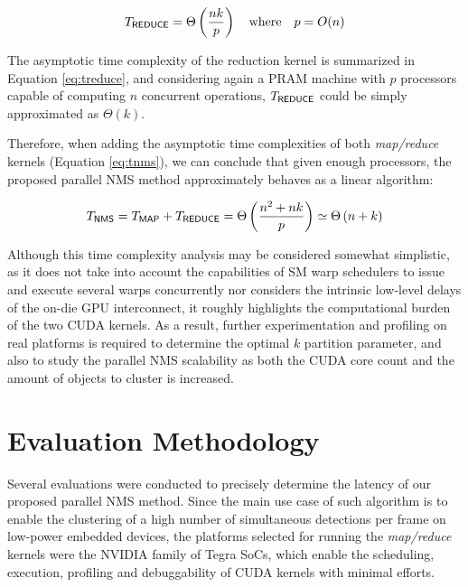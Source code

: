 \begin{equation}
\label{eq:treduce}
T_{\tiny\textsf{REDUCE}\normalsize} = \Theta\left(\frac{nk}{p}\right) \quad \textrm{where} \quad p = O(n)
\end{equation}

\bigbreak

The asymptotic time complexity of the reduction kernel is summarized in Equation \ref{eq:treduce}, and considering again 
a PRAM machine with $p$ processors capable of computing $n$ concurrent operations, $T_{\tiny\textsf{REDUCE}\normalsize}$ 
could be simply approximated as $\Theta\left(k\right)$.

Therefore, when adding the asymptotic time complexities of both \emph{map/reduce} kernels (Equation \ref{eq:tnms}), 
we can conclude that given enough processors, the proposed parallel NMS method approximately behaves as a linear algorithm:

\small
\begin{equation}
\label{eq:tnms}
T_{\tiny\textsf{NMS}\normalsize} = T_{\tiny\textsf{MAP}\normalsize} + T_{\tiny\textsf{REDUCE}\normalsize} = \Theta\left(\frac{n^2 + nk}{p}\right) \simeq \Theta\left(n + k\right)  
\end{equation}
\normalsize

Although this time complexity analysis may be considered somewhat simplistic, as it does not take into account the capabilities of 
SM warp schedulers to issue and execute several warps concurrently nor considers the intrinsic low-level delays of the on-die GPU 
interconnect, it roughly highlights the computational burden of the two CUDA kernels. As a result, further experimentation and profiling 
on real platforms is required to determine the optimal $k$ partition parameter, and also to study the parallel NMS scalability 
as both the CUDA core count and the amount of objects to cluster is increased.


\section{Evaluation Methodology}
\label{sec:methodology}

Several evaluations were conducted to precisely determine the latency of our proposed parallel NMS method. Since the main 
use case of such algorithm is to enable the clustering of a high number of simultaneous detections per frame on low-power 
embedded devices, the platforms selected for running the \emph{map/reduce} kernels were the NVIDIA family of Tegra SoCs, 
which enable the scheduling, execution, profiling and debuggability of CUDA kernels with minimal efforts.

